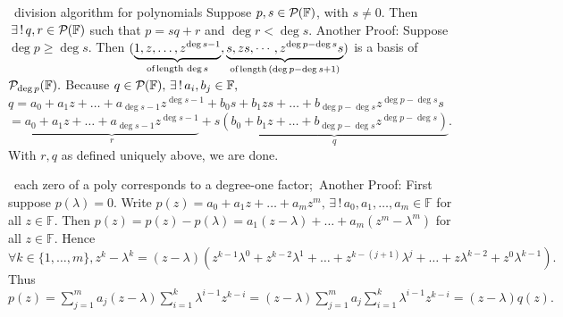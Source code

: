 \documentclass[a4paper, 11pt, UTF8]{article}
\newcommand{\Largesl}[1]{{\Large\tgsl#1}}
\def\Fbb{{\mathbb{F}}}
\def\BulletPoint{{\small\bullet}}
\begin{document}
\begin{large}
\BulletPoint \,\hspace{1pt}\NoteFor{[4.8]} {\tgsl division algorithm for polynomials}\TextB{}
{\tgsl\normalsize Suppose $p, s\in\PoF{}$, with $s\neq 0$. Then $\,\exists\,!\,q, r\in\PoF{}$ such that $p = sq + r$ and $\deg r < \deg s$.} \Largesl{Another Proof:}\TextB{}
Suppose $\deg p\geq \deg s$. Then $(\underbrace{1, z,\dots, z^{\deg s-1}}_{\textup{of\,length}\,\deg s},\underbrace{s,zs,\cdots,z^{\deg p-\deg s}s}_{\textup{of\,length}\,(\deg p-\deg s+1)})$ is a basis of $\PoF{\deg p}.$\TextB{}
Because $q\in\PoF{},\,\exists\,!\,a_i,b_j\in\Fbb,$\TextB{}
$q=a_0+a_1 z+\dots+a_{\deg s-1}z^{\deg s-1}+ b_0 s+b_1 zs +\dots+ b_{\deg p-\deg s}z^{\deg p-\deg s}s$\TextB{}
$=\underbrace{a_0+a_1 z+\dots+a_{\deg s-1}z^{\deg s-1}}_{r}+s\underbrace{(b_0+b_1 z +\dots+ b_{\deg p-\deg s}z^{\deg p-\deg s})}_{q}.$\TextB{}
With $r,q$ as defined uniquely above, we are done.\PfEnd
\SepLine\par

\BulletPoint \,\hspace{1pt}\NoteFor{[4.11]} {\tgsl each zero of a poly corresponds to a degree-one factor;}\,\,\,\Largesl{Another Proof:}\TextB{}
First suppose $p(\lambda)=0.$ Write $p(z)=a_0+a_1 z+\dots+a_m z^m,\,\exists\,!\,a_0,a_1,\dots,a_m\in\Fbb$ for all $z\in\Fbb.$\TextB{}
Then $p(z)=p(z)-p(\lambda)=a_1(z-\lambda)+\dots+a_m(z^m-\lambda^m)$ for all $z\in\Fbb.$\TextB{}
Hence $\forall k\in\{1,\dots,m\},z^k-\lambda^k=(z-\lambda)( z^{k-1}\lambda^0+ z^{k-2}\lambda^1+\dots+z^{k-(j+1)}\lambda^j+\dots+z\lambda^{k-2}+z^0\lambda^{k-1}).$\TextB{}
Thus $p(z)=\sum\limits_{j=1}^m a_j (z-\lambda)\sum\limits_{i=1}^k \lambda^{i-1}z^{k-i}=(z-\lambda)\sum\limits_{j=1}^m a_j\sum\limits_{i=1}^k \lambda^{i-1}z^{k-i}=(z-\lambda)q(z).$
\par
\SepLine\par


\end{large}
\end{document}
